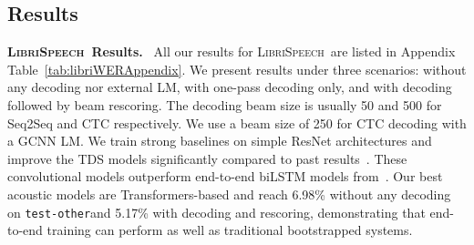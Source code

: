 \documentclass{article}
\def\testother{\texttt{test-other}}
\newcommand{\librispeech}{\textsc{LibriSpeech}}
\begin{document}
\subsection{Results}
\label{sec:results}

\textbf{\librispeech~Results.}~
All our results for \librispeech~are listed in Appendix Table~\ref{tab:libriWERAppendix}. We present results under three scenarios: without any decoding nor external LM, with one-pass decoding only, and with decoding followed by beam rescoring. The decoding beam size is usually 50 and 500 for Seq2Seq and CTC respectively. We use a beam size of 250 for CTC decoding with a GCNN LM.
We train strong baselines on simple ResNet architectures and improve the TDS models significantly compared to past results~\cite{hannun2019TDS}. These convolutional models outperform end-to-end biLSTM models from~\cite{luscher2019transformers}. 
Our best acoustic models are Transformers-based and reach 6.98\% without any decoding on \testother and 5.17\% with decoding and rescoring,
demonstrating that end-to-end training can perform as well as traditional bootstrapped systems.
\end{document}
